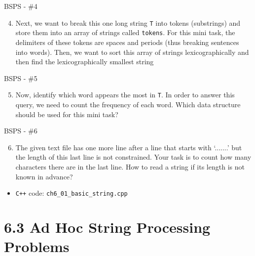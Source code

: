 \documentclass{beamer}
\begin{document}
\begin{frame}[fragile]{BSPS - \#4}
    \begin{enumerate}
        \setcounter{enumi}{3}
        \item Next, we want to break this one long string \verb|T| into tokens (substrings) and store them into an array of strings called \verb|tokens|. For this mini task, the delimiters of these tokens are spaces and periods (thus breaking sentences into words). Then, we want to sort this array of strings lexicographically and then find the lexicographically smallest string
    \end{enumerate}
\end{frame}

\begin{frame}[fragile]{BSPS - \#5}
    \begin{enumerate}
        \setcounter{enumi}{4}
        \item Now, identify which word appears the most in \verb|T|. In order to answer this query, we need to count the frequency of each word. Which data structure should be used for this mini task?
    \end{enumerate}
\end{frame}

\begin{frame}[fragile]{BSPS - \#6}
    \begin{enumerate}
        \setcounter{enumi}{5}
        \item The given text file has one more line after a line that starts with ‘.......’ but the length of this last line is not constrained. Your task is to count how many characters there are in the last line. How to read a string if its length is not known in advance?
    \end{enumerate}
    \begin{itemize}
    \item \color{red}\verb|C++| code: \verb|ch6_01_basic_string.cpp|\color{black}
    \end{itemize}
\end{frame}


\section{6.3 Ad Hoc String Processing Problems}
\end{document}

